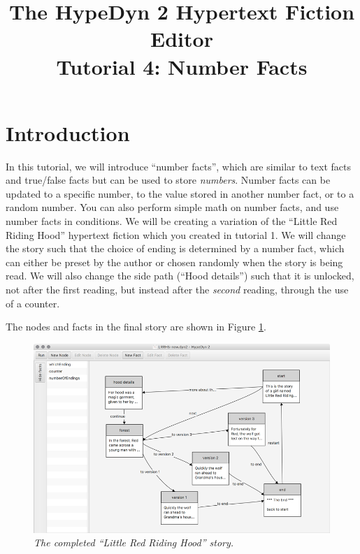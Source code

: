 \documentclass{article}
\begin{document}
\title{The HypeDyn 2 Hypertext Fiction Editor\\Tutorial 4: Number Facts}
\date{}

\onecolumn
\maketitle

\tableofcontents

\section{Introduction}
In this tutorial, we will introduce ``number facts'', which are similar to text facts and true\slash false facts but can be used to store \textit{numbers}. Number facts can be updated to a specific number, to the value stored in another number fact, or to a random number. You can also perform simple math on number facts, and use number facts in conditions. We will be creating a variation of the ``Little Red Riding Hood'' hypertext fiction which you created in tutorial 1. We will change the story such that the choice of ending is determined by a number fact, which can either be preset by the author or chosen randomly when the story is being read. We will also change the side path (``Hood details'')
such that it is unlocked, not after the first reading, but instead after the \textit{second} reading, through the use of a counter.


The nodes and facts in the final story are shown in Figure
\ref{fig:tut3:completed}.

\begin{figure}[h]
  \centering
  \includegraphics[width=12cm]{images/hypedyn-tutorial-4-figure-1}
  \caption{\textit{The completed ``Little Red Riding Hood'' story.}}
  \label{fig:tut3:completed}
\end{figure} 
\end{document}
